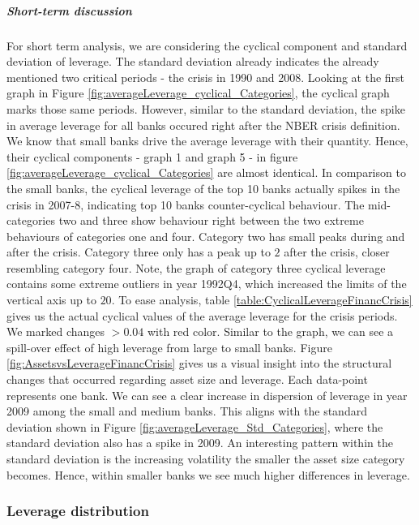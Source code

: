 \documentclass[12pt, a4paper]{article} %
\begin{document}
\subparagraph{Short-term discussion} 

For short term analysis, we are considering the cyclical component and standard deviation of leverage. The standard deviation already indicates the already mentioned two critical periods - the crisis in 1990 and 2008. Looking at the first graph in Figure \ref{fig:averageLeverage_cyclical_Categories}, the cyclical graph marks those same periods. However, similar to the standard deviation, the spike in average leverage for all banks occured right after the NBER crisis definition. We know that small banks drive the average leverage with their quantity. Hence, their cyclical components - graph 1 and graph 5 - in figure \ref{fig:averageLeverage_cyclical_Categories} are almost identical. In comparison to the small banks, the cyclical leverage of the top 10 banks actually spikes in the crisis in 2007-8, indicating top 10 banks counter-cyclical behaviour. The mid-categories two and three show behaviour right between the two extreme behaviours of categories one and four. Category two has small peaks during and after the crisis. Category three only has a peak up to $2$ after the crisis, closer resembling category four. Note, the graph of category three cyclical leverage contains some extreme outliers in year 1992Q4, which increased the limits of the vertical axis up to $20$.
To ease analysis, table \ref{table:CyclicalLeverageFinancCrisis} gives us the actual cyclical values of the average leverage for the crisis periods. We marked changes $>0.04$ with red color. Similar to the graph, we can see a spill-over effect of high leverage from large to small banks. Figure \ref{fig:AssetsvsLeverageFinancCrisis} gives us a visual insight into the structural changes that occurred regarding asset size and leverage. Each data-point represents one bank. We can see a clear increase in dispersion of leverage in year 2009 among the small and medium banks. This aligns with the standard deviation shown in Figure \ref{fig:averageLeverage_Std_Categories}, where the standard deviation also has a spike in 2009. An interesting pattern within the standard deviation is the increasing volatility the smaller the asset size category becomes. Hence, within smaller banks we see much higher differences in leverage. 



\subsubsection{Leverage distribution}
\end{document}
